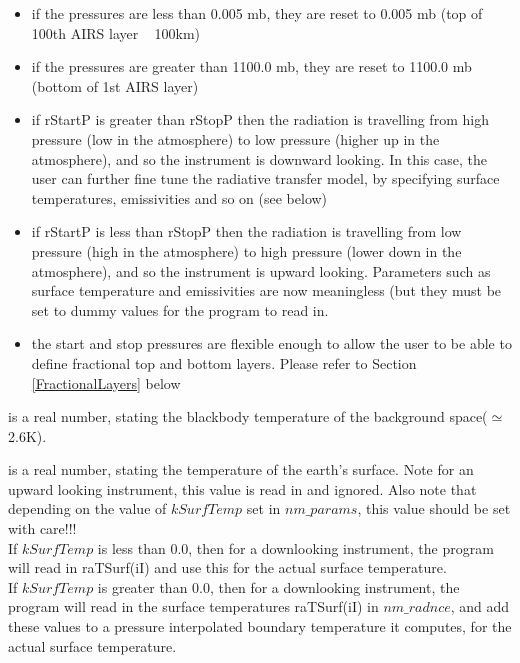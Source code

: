 \documentclass[12pt]{article}
\begin{document}
{\begin{description}
\begin{itemize}
\item if the pressures are less than 0.005 mb, they are reset to 0.005
  mb (top of 100th AIRS layer ~ 100km)
\item if the pressures are greater than 1100.0 mb, they are reset to
  1100.0 mb (bottom of 1st AIRS layer)
\item if {\sf rStartP} is greater than {\sf rStopP} then the radiation is
  travelling from high pressure (low in the atmosphere) to low
  pressure (higher up in the atmosphere), and so the instrument is
  downward looking.  In this case, the user can further fine tune the
  radiative transfer model, by specifying surface temperatures,
  emissivities and so on (see below)
\item if {\sf rStartP} is less than {\sf rStopP} then the radiation is
  travelling from low pressure (high in the atmosphere) to high
  pressure (lower down in the atmosphere), and so the instrument is
  upward looking.  Parameters such as surface temperature and
  emissivities are now meaningless (but they {\sf must} be set to
  dummy values for the program to read in.
\item the start and stop pressures are flexible enough to allow the
  user to be able to define fractional top and bottom layers.  Please
  refer to Section \ref{FractionalLayers} below
\end{itemize}

\item[{\sf raTSpace(iI)}] is a real number, stating the blackbody 
temperature of the background space($\simeq$ 2.6K). \\

\item[{\sf raTSurf(iI)}] is a real number, stating the
temperature of the earth's surface.  Note for an upward looking
instrument, this value is read in and ignored. Also note that depending on the
value of $kSurfTemp$ set in $nm\_params$, this value should be set with 
care!!!\\
If $kSurfTemp$ is less than 0.0, then for a downlooking instrument, the 
program will read in raTSurf(iI) and use this for the actual surface 
temperature.\\
If $kSurfTemp$ is greater than 0.0, then for a downlooking instrument, the 
program will read in the surface temperatures raTSurf(iI) in $nm\_radnce$, 
and add these values to a pressure interpolated boundary temperature it 
computes, for the actual surface temperature.


\end{description}}
\end{document}
